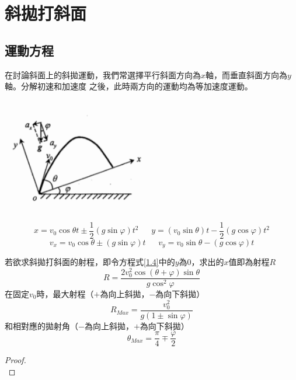 \documentclass[cn,10pt,math=newtx,chinesefont=founder]{../elegantbook}
\begin{document}
\section{斜拋打斜面}
\subsection{運動方程}
在討論斜面上的斜拋運動，我們常選擇平行斜面方向為$x$軸，而垂直斜面方向為$y$軸。分解初速和加速度
之後，此時兩方向的運動均為等加速度運動。\\
\begin{minipage}{\linewidth}
    \begin{minipage}{0.45\linewidth}
\raggedleft
\flushleft
\includegraphics[width=0.5\textwidth]{image/斜拋打斜面.png}
    \end{minipage}
    \hspace{0.05\linewidth}
    \begin{minipage}{0.45\linewidth}
\raggedright
\begin{equation} \label{1.5}
    x = v_0 \cos\theta t\pm \frac{1}{2}(g \sin \varphi) t^2 \ \ \ \ \ \ \ y = (v_0 \sin\theta)t -\frac{1}{2}(g\cos \varphi) t^2
\end{equation}
\begin{equation}
    v_x = v_0 \cos\theta \pm (g \sin \varphi) t \ \ \ \ \ \ \ v_y = v_0 \sin\theta - (g\cos \varphi) t
\end{equation}
    \end{minipage}
\end{minipage}
若欲求斜拋打斜面的射程，即令方程式\ref{1.4}中的$y$為0，求出的$x$值即為射程$R$
\begin{equation}
    R = \frac{2v_0^2 \cos (\theta+\varphi)\sin \theta}{g\cos^2 \varphi}
\end{equation}
在固定$v_0$時，最大射程（$+$為向上斜拋，$-$為向下斜拋）
\begin{equation}
    R_{Max}=\frac{v_0^2}{g(1\pm \sin \varphi)}
\end{equation}
和相對應的拋射角（$-$為向上斜拋，$+$為向下斜拋）
\begin{equation}
    \theta_{Max} = \frac{\pi}{4} \mp \frac{\varphi}{2}
\end{equation}
\begin{proof}
    \\[20em]
\end{proof}
\end{document}
